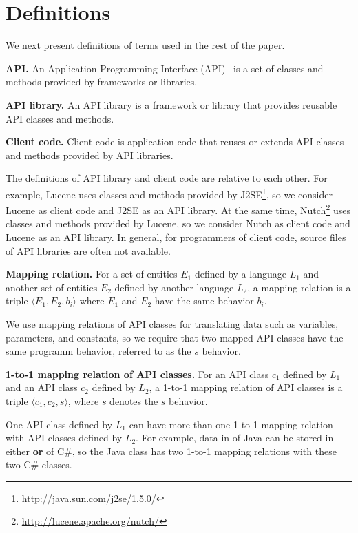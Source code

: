 \section{Definitions}
\label{sec:mapping}

We next present definitions of terms used in the rest of the paper.

\textbf{API.} An Application Programming Interface (API)~\cite{orenstein2000quickstudy}
is a set of classes and methods provided by frameworks or libraries.

\textbf{API library.} An API library is a framework
or library that provides reusable API classes and methods.

\textbf{Client code.} Client code is application code
that reuses or extends API classes and methods provided by API
libraries.

The definitions of API library and client code are
relative to each other. For example, Lucene uses classes and methods provided by
J2SE\footnote{\url{http://java.sun.com/j2se/1.5.0/}}, so we consider Lucene as client code and J2SE as an API library. At the same time, Nutch\footnote{\url{http://lucene.apache.org/nutch/}} uses classes and methods provided by Lucene, so we consider Nutch as client code and Lucene as an API library. In
general, for programmers of client code, source files of API libraries are often
not available.

\textbf{Mapping relation.} For a set of entities $E_1$ defined by a
language $L_1$ and another set of entities $E_2$ defined by another
language $L_2$, a mapping relation is a triple $\langle E_1, E_2,
b_i \rangle$ where $E_1$ and $E_2$ have the same behavior $b_i$.


We use mapping relations of API classes for translating data such as
variables, parameters, and constants, so we require that two mapped
API classes have the same programm behavior, referred to as
the $s$ behavior.

\textbf{1-to-1 mapping relation of API classes.} For an API class
$c_1$ defined by $L_1$ and an API class $c_2$ defined by $L_2$, a
1-to-1 mapping relation of API classes is a triple $\langle c_1,
c_2, s \rangle$, where $s$ denotes the $s$ behavior.

One API class defined by $L_1$ can have more than one 1-to-1 mapping
relation with API classes defined by $L_2$. For example, data in
 of Java can be stored in either
 \textbf{or}
 of C\#, so the Java class
has two 1-to-1 mapping relations with these two C\# classes.

